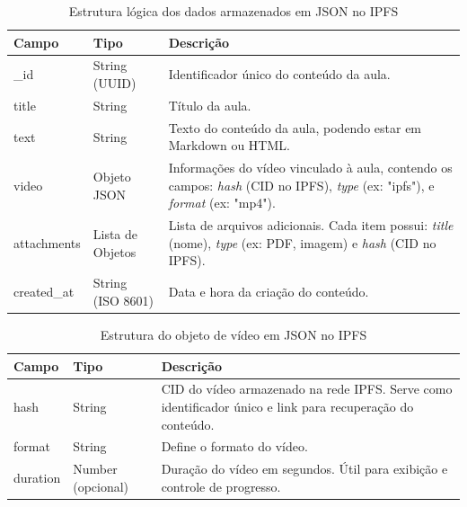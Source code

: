 \begin{apendicesenv}
    \begin{table}[h]
        \centering
        \caption{Estrutura lógica dos dados armazenados em JSON no IPFS}
        \label{tab:json-schema-ipfs}
        \begin{adjustbox}{width=\textwidth}
            \begin{tabular}{|p{3cm}|p{3cm}|p{8cm}|}
                \hline
                \textbf{Campo} & \textbf{Tipo} & \textbf{Descrição} \\
                \hline
                \_id & String (UUID) & Identificador único do conteúdo da aula. \\
                \hline
                title & String & Título da aula. \\
                \hline
                text & String & Texto do conteúdo da aula, podendo estar em Markdown ou HTML. \\
                \hline
                video & Objeto JSON & Informações do vídeo vinculado à aula, contendo os campos: \textit{hash} (CID no IPFS), \textit{type} (ex: "ipfs"), e \textit{format} (ex: "mp4"). \\
                \hline
                attachments & Lista de Objetos & Lista de arquivos adicionais. Cada item possui: \textit{title} (nome), \textit{type} (ex: PDF, imagem) e \textit{hash} (CID no IPFS). \\
                \hline
                created\_at & String (ISO 8601) & Data e hora da criação do conteúdo. \\
                \hline
            \end{tabular}
        \end{adjustbox}
    \end{table}
    
    \begin{table}[h]
        \centering
        \caption{Estrutura do objeto de vídeo em JSON no IPFS}
        \label{tab:json-schema-video}
        \begin{adjustbox}{width=\textwidth}
            \begin{tabular}{|p{4cm}|p{3cm}|p{8cm}|}
                \hline
                \textbf{Campo} & \textbf{Tipo} & \textbf{Descrição} \\
                \hline
                hash & String & CID do vídeo armazenado na rede IPFS. Serve como identificador único e link para recuperação do conteúdo. \\
                \hline
                format & String & Define o formato do vídeo. \\
                \hline
                duration & Number (opcional) & Duração do vídeo em segundos. Útil para exibição e controle de progresso. \\
                \hline
            \end{tabular}
        \end{adjustbox}
    \end{table}
    

\end{apendicesenv}
